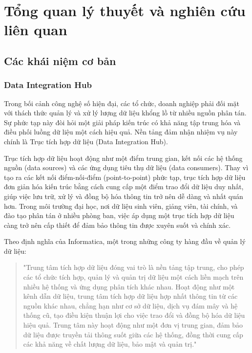 \chapter{Tổng quan lý thuyết và nghiên cứu liên quan}

\section{Các khái niệm cơ bản}
\subsection{Data Integration Hub}
Trong bối cảnh công nghệ số hiện đại, các tổ chức, doanh nghiệp phải đối mặt với thách thức quản lý và xử lý lượng dữ liệu khổng lồ từ nhiều nguồn phân tán. Sự phức tạp này đòi hỏi một giải pháp kiến trúc có khả năng tập trung hóa và điều phối luồng dữ liệu một cách hiệu quả. Nền tảng đảm nhận nhiệm vụ này chính là Trục tích hợp dữ liệu (Data Integration Hub).

Trục tích hợp dữ liệu hoạt động như một điểm trung gian, kết nối các hệ thống nguồn (data sources) và các ứng dụng tiêu thụ dữ liệu (data consumers). Thay vì tạo ra các kết nối điểm-nối-điểm (point-to-point) phức tạp, trục tích hợp dữ liệu đơn giản hóa kiến trúc bằng cách cung cấp một điểm trao đổi dữ liệu duy nhất, giúp việc lưu trữ, xử lý và đồng bộ hóa thông tin trở nên dễ dàng và nhất quán hơn. Trong môi trường đại học, nơi dữ liệu sinh viên, giảng viên, tài chính, và đào tạo phân tán ở nhiều phòng ban, việc áp dụng một trục tích hợp dữ liệu càng trở nên cấp thiết để đảm bảo thông tin được xuyên suốt và chính xác.

Theo định nghĩa của Informatica, một trong những công ty hàng đầu về quản lý dữ liệu:
\begin{quote}
"Trung tâm tích hợp dữ liệu đóng vai trò là nền tảng tập trung, cho phép các tổ chức tích hợp, quản lý và quản trị dữ liệu một cách liền mạch trên nhiều hệ thống và ứng dụng phân tích khác nhau. Hoạt động như một kênh dẫn dữ liệu, trung tâm tích hợp dữ liệu hợp nhất thông tin từ các nguồn khác nhau, chẳng hạn như cơ sở dữ liệu, dịch vụ đám mây và hệ thống cũ, tạo điều kiện thuận lợi cho việc trao đổi và đồng bộ hóa dữ liệu hiệu quả. Trung tâm này hoạt động như một đơn vị trung gian, đảm bảo dữ liệu được truyền tải thông suốt giữa các hệ thống, đồng thời cung cấp các khả năng về chất lượng dữ liệu, bảo mật và quản trị." \cite{informatica:whatisdih}
\end{quote}

